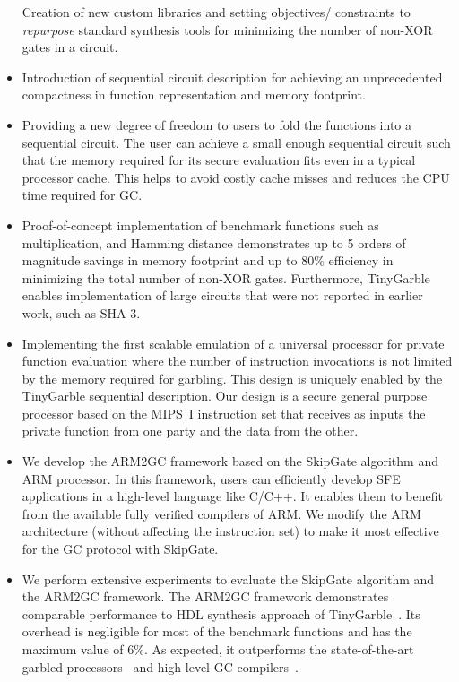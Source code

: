 \begin{itemize}
  Creation of new custom libraries and setting objectives/ constraints to \emph{repurpose} standard synthesis tools for minimizing the number of non-XOR gates in a circuit.
\item
  Introduction of sequential circuit description for achieving an unprecedented compactness in function representation and memory footprint.
\item
  Providing a new degree of freedom to users to fold the functions into a sequential circuit.
  The user can achieve a small enough sequential circuit such that the memory required for its secure evaluation fits even in a typical processor cache.
  This helps to avoid costly cache misses and reduces the CPU time required for GC.
\item
  Proof-of-concept implementation of benchmark functions such as multiplication, and Hamming distance demonstrates up to 5 orders of magnitude savings in memory footprint and up to $80\%$ efficiency in minimizing the total number of non-XOR gates.
  Furthermore, TinyGarble enables implementation of large circuits that were not reported in earlier work, such as SHA-3.%

\item
  Implementing the first scalable emulation of a universal processor for private function evaluation where the number of instruction invocations is not limited by the memory required for garbling.
  This design is uniquely enabled by the TinyGarble sequential description.
  Our design is a secure general purpose processor based on the MIPS~I instruction set that receives as inputs the private function from one party and the data from the other.
\item We develop the ARM2GC framework based on the SkipGate algorithm and ARM processor.
    In this framework, users can efficiently develop SFE applications in a high-level language like C/C++.
    It enables them to benefit from the available fully verified compilers of ARM.
    We modify the ARM architecture (without affecting the instruction set) to make it most effective for the GC protocol with SkipGate.
\item We perform extensive experiments to evaluate the SkipGate algorithm and the ARM2GC framework.
    The ARM2GC framework demonstrates comparable performance to HDL synthesis approach of TinyGarble~\cite{songhori2015tinygarble}.
    Its overhead is negligible for most of the benchmark functions and has the maximum value of 6\%.
    As expected, it outperforms the state-of-the-art garbled processors~\cite{wang2016secure, songhori2016garbledcpu} and high-level GC compilers~\cite{holzer2012secure, mood2016frigate}.
\end{itemize}

